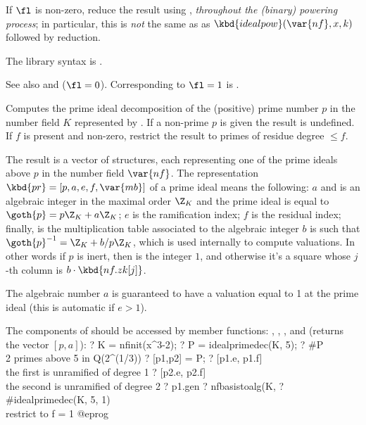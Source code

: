 If $\fl$ is non-zero, reduce the result using , \emph{throughout
the (binary) powering process}; in particular, this is \emph{not} the same as
as $\kbd{idealpow}(\var{nf},x,k)$ followed by reduction.

The library syntax is .

\noindent See also
 and
 ($\fl = 0$).
Corresponding to $\fl=1$ is .

\label{se:idealprimedec}
Computes the prime ideal
decomposition of the (positive) prime number $p$ in the number field $K$
represented by . If a non-prime $p$ is given the result is undefined.
If $f$ is present and non-zero, restrict the result to primes of residue
degree $\leq f$.

The result is a vector of  structures, each representing one of the
prime ideals above $p$ in the number field $\var{nf}$. The representation
$\kbd{pr}=[p,a,e,f,\var{mb}]$ of a prime ideal means the following: $a$ and
is an algebraic integer in the maximal order $\Z_K$ and the prime ideal is
equal to $\goth{p} = p\Z_K + a\Z_K$;
$e$ is the ramification index; $f$ is the residual index;
finally,  is the multiplication table associated to the algebraic
integer $b$ is such that $\goth{p}^{-1}=\Z_K+ b/ p\Z_K$, which is used
internally to compute valuations. In other words if $p$ is inert,
then  is the integer $1$, and otherwise it's a square 
whose $j$-th column is $b \cdot \kbd{nf.zk[j]}$.

The algebraic number $a$ is guaranteed to have a
valuation equal to 1 at the prime ideal (this is automatic if $e>1$).

The components of  should be accessed by member functions: ,
, , and  (returns the vector $[p,a]$):
\bprog
? K = nfinit(x^3-2);
? P = idealprimedec(K, 5);
? #P       \\ 2 primes above 5 in Q(2^(1/3))
? [p1,p2] = P;
? [p1.e, p1.f]    \\ the first is unramified of degree 1
? [p2.e, p2.f]    \\ the second is unramified of degree 2
? p1.gen
? nfbasistoalg(K, %
? #idealprimedec(K, 5, 1) \\ restrict to f = 1
@eprog

